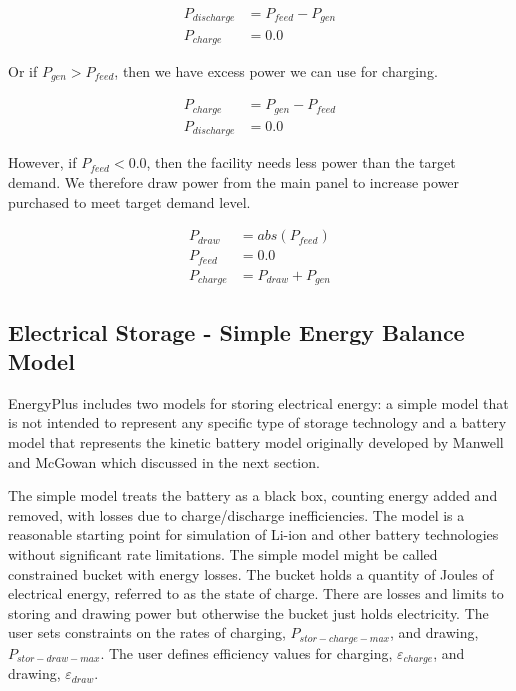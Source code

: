\begin{equation}
  \begin{array}{rl}
    {P_{discharge}} &=  {P_{feed}} - {P_{gen}} \\
    {P_{charge}} &= 0.0
  \end{array}
\end{equation}

Or if ${P_{gen}} > {P_{feed}}$, then we have excess power we can use for charging.

\begin{equation}
  \begin{array}{rl}
    {P_{charge}} &= {P_{gen}} - {P_{feed}} \\
    {P_{discharge}} &= 0.0
  \end{array}
\end{equation}

However, if ${P_{feed}} < 0.0$, then the facility needs less power than the target demand.  We therefore draw power from the main panel to increase power purchased to meet target demand level.

\begin{equation}
  \begin{array}{rl}
   {P_{draw}} &= { abs( {P_{feed}} )} \\
    {P_{feed}} &= 0.0 \\
    {P_{charge}} &= {P_{draw}} + {P_{gen}}
  \end{array}
\end{equation}

\subsection{Electrical Storage - Simple Energy Balance Model}

EnergyPlus includes two models for storing electrical energy: a simple model that is not intended to represent any specific type of storage technology and a battery model that represents the kinetic battery model originally developed by Manwell and McGowan which discussed in the next section.

The simple model treats the battery as a black box, counting energy added and removed, with losses due to charge/discharge inefficiencies. The model is a reasonable starting point for simulation of Li-ion and other battery technologies without significant rate limitations. The simple model might be called constrained bucket with energy losses.  The bucket holds a quantity of Joules of electrical energy, referred to as the state of charge. There are losses and limits to storing and drawing power but otherwise the bucket just holds electricity. The user sets constraints on the rates of charging, ${P_{stor-charge-max}}$, and drawing, ${P_{stor-draw-max}}$. The user defines efficiency values for charging, ${\varepsilon_{charge}}$, and drawing, ${\varepsilon_{draw}}$.

